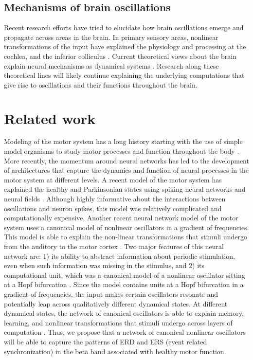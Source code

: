 \documentclass{article}
\begin{document}
\subsection{Mechanisms of brain oscillations}

Recent research efforts have tried to elucidate how brain oscillations emerge and propagate across areas in the brain. In primary sensory areas, nonlinear transformations of the input have explained the physiology and processing at the cochlea, and the inferior colliculus \cite{lerud2014pitch}. Current theoretical views about the brain explain neural mechanisms as dynamical systems \cite{izhikevich2007dynamical}. Research along these theoretical lines will likely continue explaining the underlying computations that give rise to oscillations and their functions throughout the brain.

\section{Related work}

Modeling of the motor system has a long history starting with the use of simple model organisms to study motor processes and function throughout the body \cite{rizzolatti2001cortical}. More recently, the momentum around neural networks has led to the development of architectures that capture the dynamics and function of neural processes in the motor system at different levels. A recent model of the motor system has explained the healthy and Parkinsonian states using spiking neural networks and neural fields \cite{kerr2013cortical}. Although highly informative about the interactions between oscillations and neuron spikes, this model was relatively complicated and computationally expensive. Another recent neural network model of the motor system uses a canonical model of nonlinear oscillators in a gradient of frequencies. This model is able to explain the non-linear transformations that stimuli undergo from the auditory to the motor cortex \cite{large2015neural}. Two major features of this neural network are: 1) its ability to abstract information about periodic stimulation, even when such information was missing in the stimulus, and 2) its computational unit, which was a canonical model of a nonlinear oscillator sitting at a Hopf bifurcation \cite{large2010canonical}. Since the model contains units at a Hopf bifurcation in a gradient of frequencies, the input makes certain oscillators resonate and potentially leap across qualitatively different dynamical states. At different dynamical states, the network of canonical oscillators is able to explain memory, learning, and nonlinear transformations that stimuli undergo across layers of computation \cite{large2010canonical}. Thus, we propose that a network of canonical nonlinear oscillators will be able to capture the patterns of ERD and ERS (event related synchronization) in the beta band associated with healthy motor function.
\end{document}
